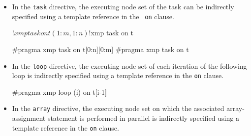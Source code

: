 \begin{itemize}
\item In the {\tt task} directive, the executing node set of the task
      can be indirectly specified using a template reference in the {\tt
      on} clause.

\vspace{0.5cm}
\begin{minipage}{0.43\hsize}
\begin{center}
\begin{XFexample}
!$xmp task on t(1:m,1:n)
!$xmp task on t
\end{XFexample}
\end{center}
\end{minipage}
%
\begin{minipage}{0.49\hsize}
\begin{center}
\begin{XCexampleR}
#pragma xmp task on t[0:n][0:m]
#pragma xmp task on t
\end{XCexampleR}
\end{center}
\end{minipage}

\item In the {\tt loop} directive, the executing node set of each
      iteration of the following loop is indirectly specified using a
      template reference in the {\tt on} clause.

\vspace{0.5cm}
\begin{minipage}{0.43\hsize}
\begin{center}
\end{center}
\end{minipage}
%
\begin{minipage}{0.49\hsize}
\begin{center}
\begin{XCexampleR}
#pragma xmp loop (i) on t[i-1]
\end{XCexampleR}
\end{center}
\end{minipage}

\item In the {\tt array} directive, the executing node set on which the
      associated array-assignment statement is performed in parallel is
      indirectly specified using a template reference in the {\tt on}
      clause.


\end{itemize}
